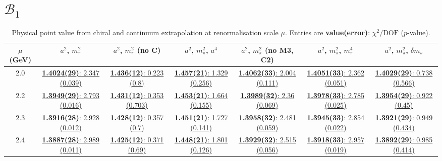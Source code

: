 \documentclass[12pt]{extarticle}
\begin{document}
\section{$\mathcal{B}_1$}
\begin{table}[h!]
\begin{center}
\begin{tabular}{|c|c|c|c|c|c|c|}
\hline
$\mu$ (GeV) & $a^2$, $m_\pi^2$& $a^2$, $m_\pi^2$ (no C)& $a^2$, $m_\pi^2$, $a^4$& $a^2$, $m_\pi^2$ (no M3, C2)& $a^2$, $m_\pi^2$, $m_\pi^4$& $a^2$, $m_\pi^2$, $\delta m_s$\\
\hline
2.0& \hyperlink{VVpAA/NPR/bag_a2m2_20.pdf.1}{\textbf{1.4024(29)}: 2.347 (0.039)} & \hyperlink{VVpAA/NPR/bag_a2m2noC_20.pdf.1}{\textbf{1.436(12)}: 0.223 (0.8)} & \hyperlink{VVpAA/NPR/bag_a2a4m2_20.pdf.1}{\textbf{1.457(21)}: 1.329 (0.256)} & \hyperlink{VVpAA/NPR/bag_a2m2mcut_20.pdf.1}{\textbf{1.4062(33)}: 2.004 (0.111)} & \hyperlink{VVpAA/NPR/bag_a2m2m4_20.pdf.1}{\textbf{1.4051(33)}: 2.362 (0.051)} & \hyperlink{VVpAA/NPR/bag_a2m2delm_20.pdf.1}{\textbf{1.4029(29)}: 0.738 (0.566)}\\
2.2& \hyperlink{VVpAA/NPR/bag_a2m2_22.pdf.1}{\textbf{1.3949(29)}: 2.793 (0.016)} & \hyperlink{VVpAA/NPR/bag_a2m2noC_22.pdf.1}{\textbf{1.431(12)}: 0.353 (0.703)} & \hyperlink{VVpAA/NPR/bag_a2a4m2_22.pdf.1}{\textbf{1.453(21)}: 1.664 (0.155)} & \hyperlink{VVpAA/NPR/bag_a2m2mcut_22.pdf.1}{\textbf{1.3989(32)}: 2.36 (0.069)} & \hyperlink{VVpAA/NPR/bag_a2m2m4_22.pdf.1}{\textbf{1.3978(33)}: 2.785 (0.025)} & \hyperlink{VVpAA/NPR/bag_a2m2delm_22.pdf.1}{\textbf{1.3954(29)}: 0.922 (0.45)}\\
2.3& \hyperlink{VVpAA/NPR/bag_a2m2_23.pdf.1}{\textbf{1.3916(28)}: 2.928 (0.012)} & \hyperlink{VVpAA/NPR/bag_a2m2noC_23.pdf.1}{\textbf{1.428(12)}: 0.357 (0.7)} & \hyperlink{VVpAA/NPR/bag_a2a4m2_23.pdf.1}{\textbf{1.451(21)}: 1.727 (0.141)} & \hyperlink{VVpAA/NPR/bag_a2m2mcut_23.pdf.1}{\textbf{1.3958(32)}: 2.481 (0.059)} & \hyperlink{VVpAA/NPR/bag_a2m2m4_23.pdf.1}{\textbf{1.3945(33)}: 2.854 (0.022)} & \hyperlink{VVpAA/NPR/bag_a2m2delm_23.pdf.1}{\textbf{1.3921(29)}: 0.949 (0.434)}\\
2.4& \hyperlink{VVpAA/NPR/bag_a2m2_24.pdf.1}{\textbf{1.3887(28)}: 2.989 (0.011)} & \hyperlink{VVpAA/NPR/bag_a2m2noC_24.pdf.1}{\textbf{1.425(12)}: 0.371 (0.69)} & \hyperlink{VVpAA/NPR/bag_a2a4m2_24.pdf.1}{\textbf{1.448(21)}: 1.801 (0.126)} & \hyperlink{VVpAA/NPR/bag_a2m2mcut_24.pdf.1}{\textbf{1.3929(32)}: 2.515 (0.056)} & \hyperlink{VVpAA/NPR/bag_a2m2m4_24.pdf.1}{\textbf{1.3918(33)}: 2.957 (0.019)} & \hyperlink{VVpAA/NPR/bag_a2m2delm_24.pdf.1}{\textbf{1.3892(29)}: 0.985 (0.414)}\\
\hline
\end{tabular}
\caption{Physical point value from chiral and continuum extrapolation at renormalisation scale $\mu$. Entries are \textbf{value(error)}: $\chi^2/\text{DOF}$ ($p$-value).}
\end{center}
\end{table}
\end{document}
